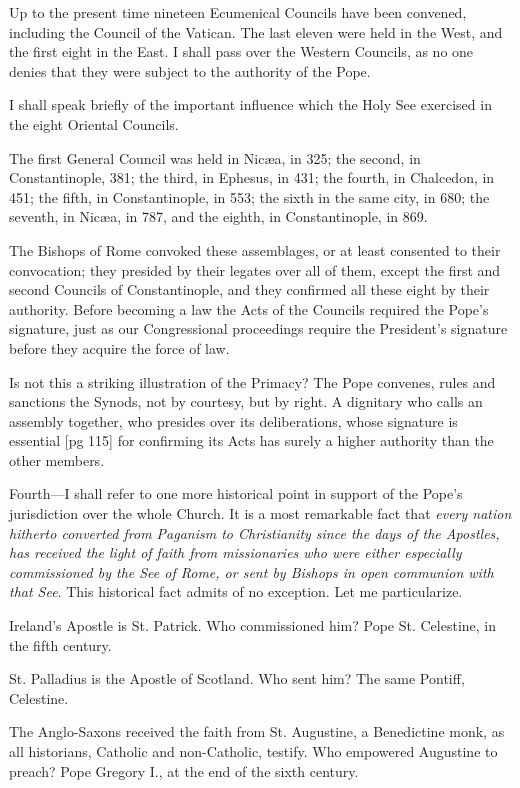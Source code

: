 Up to the present time nineteen Ecumenical
Councils have been convened, including the Council
of the Vatican. The last eleven were held in
the West, and the first eight in the East. I shall
pass over the Western Councils, as no one denies
that they were subject to the authority of the
Pope.

I shall speak briefly of the important influence
which the Holy See exercised in the eight Oriental
Councils.

The first General Council was held in Nicæa,
in 325; the second, in Constantinople, 381; the
third, in Ephesus, in 431; the fourth, in Chalcedon,
in 451; the fifth, in Constantinople, in 553;
the sixth in the same city, in 680; the seventh, in
Nicæa, in 787, and the eighth, in Constantinople,
in 869.

The Bishops of Rome convoked these assemblages,
or at least consented to their convocation;
they presided by their legates over all of them,
except the first and second Councils of Constantinople,
and they confirmed all these eight by their
authority. Before becoming a law the Acts of the
Councils required the Pope's signature, just as
our Congressional proceedings require the President's
signature before they acquire the force of
law.

Is not this a striking illustration of the Primacy?
The Pope convenes, rules and sanctions the
Synods, not by courtesy, but by right. A dignitary
who calls an assembly together, who presides
over its deliberations, whose signature is essential
[pg 115]
for confirming its Acts has surely a higher
authority than the other members.

Fourth—I shall refer to one more historical
point in support of the Pope's jurisdiction over
the whole Church. It is a most remarkable fact
that \emph{every nation hitherto converted from Paganism
to Christianity since the days of the Apostles,
has received the light of faith from missionaries
who were either especially commissioned by the
See of Rome, or sent by Bishops in open communion
with that See}. This historical fact admits of
no exception. Let me particularize.

Ireland's Apostle is St. Patrick. Who commissioned
him? Pope St. Celestine, in the fifth century.

St. Palladius is the Apostle of Scotland. Who
sent him? The same Pontiff, Celestine.

The Anglo-Saxons received the faith from St.
Augustine, a Benedictine monk, as all historians,
Catholic and non-Catholic, testify. Who empowered
Augustine to preach? Pope Gregory I., at
the end of the sixth century.

